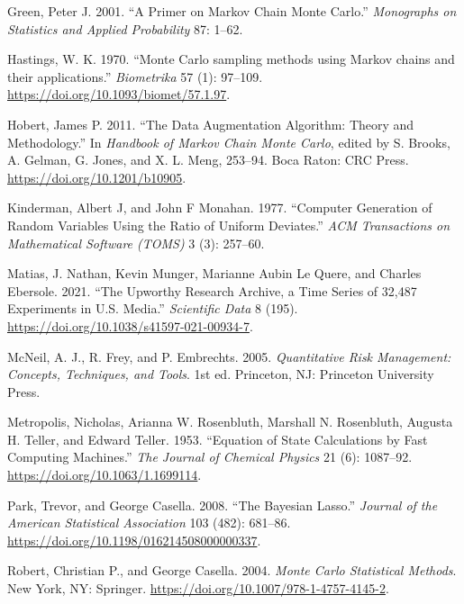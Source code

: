 \documentclass[
  11pt,
  letterpaper,
]{scrbook}
\newlength{\cslhangindent}
\newlength{\cslentryspacingunit} %
\newenvironment{CSLReferences}[2] %
 {%
  \setlength{\parindent}{0pt}
  \ifodd #1
  \let\oldpar\par
  \def\par{\hangindent=\cslhangindent\oldpar}
  \fi
  \setlength{\parskip}{#2\cslentryspacingunit}
 }%
 {}
\theoremstyle{definition}
\theoremstyle{definition}
\theoremstyle{definition}
\theoremstyle{plain}
\theoremstyle{remark}
\begin{document}
\begin{CSLReferences}{1}{0}
\leavevmode{}%
Green, Peter J. 2001. {``A Primer on {M}arkov Chain {M}onte {C}arlo.''}
\emph{Monographs on Statistics and Applied Probability} 87: 1--62.

\leavevmode{}%
Hastings, W. K. 1970. {``{Monte {C}arlo sampling methods using {M}arkov
chains and their applications}.''} \emph{Biometrika} 57 (1): 97--109.
\url{https://doi.org/10.1093/biomet/57.1.97}.

\leavevmode{}%
Hobert, James P. 2011. {``The Data Augmentation Algorithm: Theory and
Methodology.''} In \emph{Handbook of {M}arkov Chain {M}onte {C}arlo},
edited by S. Brooks, A. Gelman, G. Jones, and X. L. Meng, 253--94. Boca
Raton: CRC Press. \url{https://doi.org/10.1201/b10905}.

\leavevmode{}%
Kinderman, Albert J, and John F Monahan. 1977. {``Computer Generation of
Random Variables Using the Ratio of Uniform Deviates.''} \emph{ACM
Transactions on Mathematical Software (TOMS)} 3 (3): 257--60.

\leavevmode{}%
Matias, J. Nathan, Kevin Munger, Marianne Aubin Le Quere, and Charles
Ebersole. 2021. {``The {U}pworthy {R}esearch {A}rchive, a Time Series of
32,487 Experiments in {U.S.} Media.''} \emph{Scientific Data} 8 (195).
\url{https://doi.org/10.1038/s41597-021-00934-7}.

\leavevmode{}%
McNeil, A. J., R. Frey, and P. Embrechts. 2005. \emph{Quantitative Risk
Management: Concepts, Techniques, and Tools}. 1st ed. Princeton, NJ:
Princeton University Press.

\leavevmode{}%
Metropolis, Nicholas, Arianna W. Rosenbluth, Marshall N. Rosenbluth,
Augusta H. Teller, and Edward Teller. 1953. {``{Equation of State
Calculations by Fast Computing Machines}.''} \emph{The Journal of
Chemical Physics} 21 (6): 1087--92.
\url{https://doi.org/10.1063/1.1699114}.

\leavevmode{}%
Park, Trevor, and George Casella. 2008. {``The {B}ayesian {L}asso.''}
\emph{Journal of the American Statistical Association} 103 (482):
681--86. \url{https://doi.org/10.1198/016214508000000337}.

\leavevmode{}%
Robert, Christian P., and George Casella. 2004. \emph{Monte {C}arlo
Statistical Methods}. New York, NY: Springer.
\url{https://doi.org/10.1007/978-1-4757-4145-2}.


\end{CSLReferences}
\end{document}
